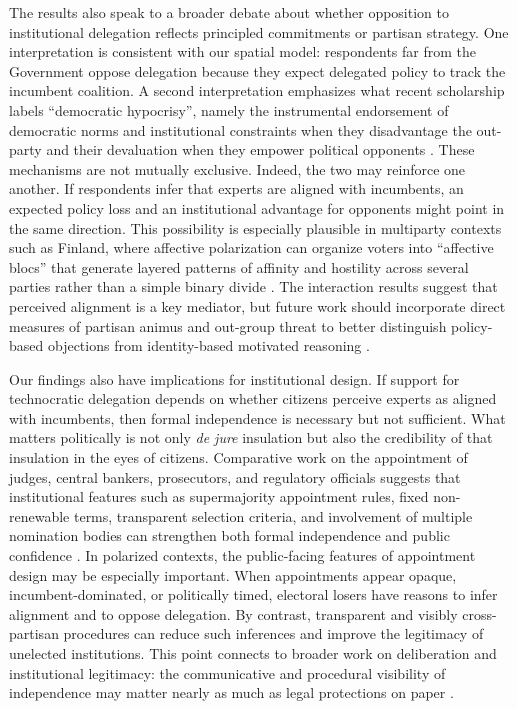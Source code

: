 \documentclass[11pt]{article}\usepackage[]{graphicx}\usepackage[]{xcolor}
\begin{document}
The results also speak to a broader debate about whether opposition to institutional delegation reflects principled commitments or partisan strategy. One interpretation is consistent with our spatial model: respondents far from the Government oppose delegation because they expect delegated policy to track the incumbent coalition. A second interpretation emphasizes what recent scholarship labels \enquote{democratic hypocrisy}, namely the instrumental endorsement of democratic norms and institutional constraints when they disadvantage the out-party and their devaluation when they empower political opponents \parencite{McCoy:2020}. These mechanisms are not mutually exclusive. Indeed, the two may reinforce one another. If respondents infer that experts are aligned with incumbents, an expected policy loss and an institutional advantage for opponents might point in the same direction. This possibility is especially plausible in multiparty contexts such as Finland, where affective polarization can organize voters into \enquote{affective blocs} that generate layered patterns of affinity and hostility across several parties rather than a simple binary divide \parencite{Kekkonen2021}. The interaction results suggest that perceived alignment is a key mediator, but future work should incorporate direct measures of partisan animus and out-group threat to better distinguish policy-based objections from identity-based motivated reasoning \parencite{Simonovits:2022}.

Our findings also have implications for institutional design. If support for technocratic delegation depends on whether citizens perceive experts as aligned with incumbents, then formal independence is necessary but not sufficient. What matters politically is not only \emph{de jure} insulation but also the credibility of that insulation in the eyes of citizens. Comparative work on the appointment of judges, central bankers, prosecutors, and regulatory officials suggests that institutional features such as supermajority appointment rules, fixed non-renewable terms, transparent selection criteria, and involvement of multiple nomination bodies can strengthen both formal independence and public confidence \parencite{Miliuviene:2024}. In polarized contexts, the public-facing features of appointment design may be especially important. When appointments appear opaque, incumbent-dominated, or politically timed, electoral losers have reasons to infer alignment and to oppose delegation. By contrast, transparent and visibly cross-partisan procedures can reduce such inferences and improve the legitimacy of unelected institutions. This point connects to broader work on deliberation and institutional legitimacy: the communicative and procedural visibility of independence may matter nearly as much as legal protections on paper \parencite{Ganuza:2020}. %
\end{document}
